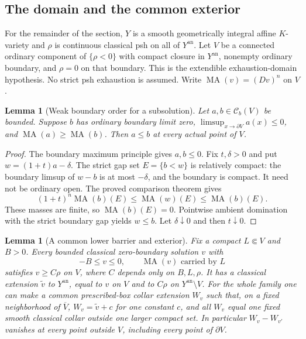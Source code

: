 \documentclass[11pt,a4paper]{article}
\numberwithin{equation}{section}
\newtheorem{lemma}[theorem]{Lemma}
\theoremstyle{definition}
\theoremstyle{remark}
\newcommand{\an}{\mathrm{an}}
\begin{document}
\subsection{The domain and the common exterior}

For the remainder of the section, $Y$ is a smooth geometrically
integral affine $K$-variety and $\rho$ is continuous classical psh
on all of $Y^{\an}$.  Let $V$ be a connected ordinary component
of $\{\rho<0\}$ with compact closure in $Y^{\an}$, nonempty ordinary
boundary, and $\rho=0$ on that boundary.  This is the extendible
exhaustion-domain hypothesis.  No strict psh exhaustion is assumed.
Write $\operatorname{MA}(v)=(Dv)^n$ on $V$.

\begin{lemma}[Weak boundary order for a subsolution]
\label{lem:r3-weak-boundary-subsolution-order}
Let $a,b\in\mathcal C_b(V)$ be bounded.  Suppose $b$ has ordinary
boundary limit zero, $\limsup_{x\to\partial V}a(x)\leq0$, and
$\operatorname{MA}(a)\geq\operatorname{MA}(b)$.  Then $a\leq b$
at every actual point of $V$.
\end{lemma}

\begin{proof}
The boundary maximum principle gives $a,b\leq0$.  Fix $t,\delta>0$
and put $w=(1+t)a-\delta$.  The strict gap set $E=\{b<w\}$ is
relatively compact: the boundary limsup of $w-b$ is at most
$-\delta$, and the boundary is compact.  It need not be ordinary
open.  The proved comparison theorem gives
\[
 (1+t)^n\operatorname{MA}(b)(E)
 \leq\operatorname{MA}(w)(E)
 \leq\operatorname{MA}(b)(E).
\]
These masses are finite, so $\operatorname{MA}(b)(E)=0$.
Pointwise ambient domination with the strict boundary gap yields
$w\leq b$.  Let $\delta\downarrow0$ and then $t\downarrow0$.
\end{proof}

\begin{lemma}[A common lower barrier and exterior]
\label{lem:r3-common-exterior-extension}
Fix a compact $L\Subset V$ and $B>0$.  Every bounded classical
zero-boundary solution $v$ with
\[
 -B\leq v\leq0,\qquad\operatorname{MA}(v)\text{ carried by }L
\]
satisfies $v\geq C\rho$ on $V$, where $C$ depends only on
$B,L,\rho$.  It has a classical extension $\widetilde v$ to
$Y^{\an}$, equal to $v$ on $V$ and to $C\rho$ on $Y^{\an}\setminus V$.
For the whole family one can make a common prescribed-box collar
extension $W_v$ such that, on a fixed neighborhood of $\overline V$,
$W_v=\widetilde v+c$ for one constant $c$, and all $W_v$ equal one
fixed smooth classical collar outside one larger compact set.
In particular $W_v-W_{v'}$ vanishes at every point outside $V$,
including every point of $\partial V$.
\end{lemma}
\end{document}
